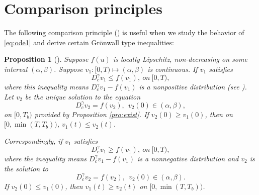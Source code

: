 \documentclass[12pt]{amsart}%
\newtheorem{pro}[thm]{Proposition}
\theoremstyle{definition}
\theoremstyle{remark}
\renewcommand{\ge}{\geqslant}
\renewcommand{\le}{\leqslant}
\begin{document}
\section{Comparison principles}\label{sec:comp}
The following comparison principle (\cite[Theorem 7]{liliu16}) is useful when we study the behavior of \eqref{eq:ode1} and derive certain Gr\"{o}nwall type inequalities:
\begin{pro}[\cite{liliu16}]\label{pro:comp}
Suppose $f(u)$ is locally Lipschitz, non-decreasing on some interval $(\alpha, \beta)$. Suppose $v_1: [0, T)\mapsto (\alpha, \beta)$ is continuous. If $v_1$ satisfies $$
D_c^{\gamma}v_1\le f(v_1), ~on~[0,T),
$$
where this inequality means $D_c^{\gamma}v_1-f(v_1)$ is a nonpositive distribution (see \cite[Def. 6]{liliu16}). Let $v_2$ be the unique solution to the equation $$
D_c^{\gamma}v_2=f(v_2), \ \ v_2(0)\in (\alpha, \beta),
$$
on $[0, T_b)$ provided by Proposition \ref{pro:exist}. If $v_2(0)\ge v_1(0)$, then on $[0, \min(T,T_b))$, $v_1(t)\le v_2(t)$.

Correspondingly, if $v_1$ satisfies 
$$
D_c^{\gamma}v_1\ge f(v_1), ~on~[0,T),
$$
where the inequality means $D_c^{\gamma}v_1-f(v_1)$ is a nonnegative distribution and $v_2$ is the solution to $$
D_c^{\gamma}v_2=f(v_2), \ \ v_2(0)\in (\alpha, \beta).
$$
If $v_2(0)\le v_1(0)$, then $v_1(t)\ge v_2(t)$ on $[0, \min(T, T_b))$.
\end{pro}
\end{document}
